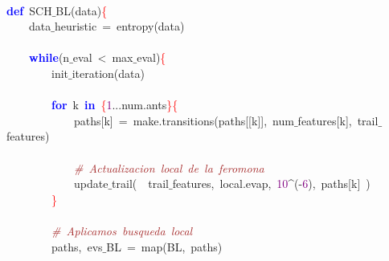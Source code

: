 \noindent
\mbox{} \\
\mbox{}\textbf{\textcolor{Blue}{def}}\ SCH$\_$BL\textcolor{BrickRed}{(}data\textcolor{BrickRed}{)}\textcolor{Red}{\{} \\
\mbox{}\ \ \ \ data$\_$heuristic\ \textcolor{BrickRed}{=}\ entropy\textcolor{BrickRed}{(}data\textcolor{BrickRed}{)} \\
\mbox{} \\
\mbox{}\ \ \ \ \textbf{\textcolor{Blue}{while}}\textcolor{BrickRed}{(}n$\_$eval\ \textcolor{BrickRed}{\textless{}}\ max$\_$eval\textcolor{BrickRed}{)}\textcolor{Red}{\{} \\
\mbox{}\ \ \ \ \ \ \ \ init$\_$iteration\textcolor{BrickRed}{(}data\textcolor{BrickRed}{)} \\
\mbox{} \\
\mbox{}\ \ \ \ \ \ \ \ \textbf{\textcolor{Blue}{for}}\ k\ \textbf{\textcolor{Blue}{in}}\ \textcolor{Red}{\{}\textcolor{Purple}{1}\textcolor{BrickRed}{...}num\textcolor{BrickRed}{.}ants\textcolor{Red}{\}\{} \\
\mbox{}\ \ \ \ \ \ \ \ \ \ \ \ paths\textcolor{BrickRed}{[}k\textcolor{BrickRed}{]}\ \textcolor{BrickRed}{=}\ make\textcolor{BrickRed}{.}transitions\textcolor{BrickRed}{(}paths\textcolor{BrickRed}{[[}k\textcolor{BrickRed}{]],}\ num$\_$features\textcolor{BrickRed}{[}k\textcolor{BrickRed}{],}\ trail$\_$features\textcolor{BrickRed}{)} \\
\mbox{} \\
\mbox{}\ \ \ \ \ \ \ \ \ \ \ \ \textit{\textcolor{Brown}{\#\ Actualizacion\ local\ de\ la\ feromona}} \\
\mbox{}\ \ \ \ \ \ \ \ \ \ \ \ update$\_$trail\textcolor{BrickRed}{(}\ \ trail$\_$features\textcolor{BrickRed}{,}\ local\textcolor{BrickRed}{.}evap\textcolor{BrickRed}{,}\ \textcolor{Purple}{10}\textcolor{BrickRed}{\textasciicircum{}(-}\textcolor{Purple}{6}\textcolor{BrickRed}{),}\ paths\textcolor{BrickRed}{[}k\textcolor{BrickRed}{]}\ \textcolor{BrickRed}{)} \\
\mbox{}\ \ \ \ \ \ \ \ \textcolor{Red}{\}} \\
\mbox{} \\
\mbox{}\ \ \ \ \ \ \ \ \textit{\textcolor{Brown}{\#\ Aplicamos\ busqueda\ local}} \\
\mbox{}\ \ \ \ \ \ \ \ paths\textcolor{BrickRed}{,}\ evs$\_$BL\ \textcolor{BrickRed}{=}\ map\textcolor{BrickRed}{(}BL\textcolor{BrickRed}{,}\ paths\textcolor{BrickRed}{)} \\
